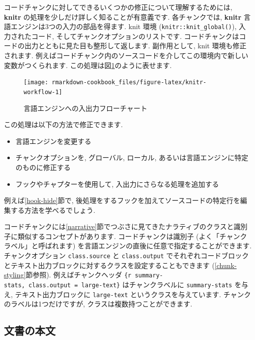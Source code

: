 \documentclass[
  11pt,
  lualatex,ja=standard,jafont=noto]{bxjsreport}
\begin{document}
コードチャンクに対してできるいくつかの修正について理解するためには, \textbf{knitr} の処理を少しだけ詳しく知ることが有意義です. 各チャンクでは, \textbf{knitr} 言語エンジンは3つの入力の部品を得ます. knit 環境 (\texttt{knitr::knit\_global()}), 入力されたコード, そしてチャンクオプションのリストです. コードチャンクはコードの出力とともに見た目も整形して返します. 副作用として, knit 環境も修正されます. 例えばコードチャンク内のソースコードを介してこの環境内で新しい変数がつくられます. この処理は図\ref{fig:knitr-workflow}のように表せます.

\begin{figure}

{\centering \texttt{[image: rmarkdown-cookbook\_files/figure-latex/knitr-workflow-1]} 

}

\caption{言語エンジンへの入出力フローチャート}\label{fig:knitr-workflow}
\end{figure}

この処理は以下の方法で修正できます.

\begin{itemize}
\item
  言語エンジンを変更する
\item
  チャンクオプションを, グローバル, ローカル, あるいは言語エンジンに特定のものに修正する
\item
  フックやチャプターを使用して, 入出力にさらなる処理を追加する
\end{itemize}

例えば\ref{hook-hide}節で, 後処理をするフックを加えてソースコードの特定行を編集する方法を学べるでしょう.

コードチャンクには\ref{narrative}節でつぶさに見てきたナラティブのクラスと識別子に類似するコンセプトがあります. コードチャンクは識別子 (よく「チャンクラベル」と呼ばれます) を言語エンジンの直後に任意で指定することができます. チャンクオプション \texttt{class.source} と \texttt{class.output} でそれぞれコードブロックとテキスト出力ブロックに対するクラスを設定することもできます (\ref{chunk-styling}節参照). 例えばチャンクヘッダ \texttt{\textasciigrave{}\textasciigrave{}\textasciigrave{}\{r\ summary-stats,\ class.output\ =\ \textquotesingle{}large-text\textquotesingle{}\}} はチャンクラベルに \texttt{summary-stats} を与え, テキスト出力ブロックに \texttt{large-text} というクラスを与えています. チャンクのラベルは1つだけですが, クラスは複数持つことができます.

\hypertarget{document-body}{%
\subsection{文書の本文}\label{document-body}}
\end{document}

